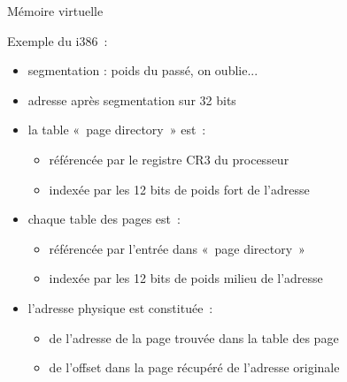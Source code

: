 \begin {frame} {Mémoire virtuelle}

    Exemple du i386~:

    \begin {itemize}
	\item segmentation : poids du passé, on oublie...
	\item adresse après segmentation sur 32 bits
	\item la table «~page directory~» est~:
	    \begin {itemize}
		\item référencée par le registre CR3 du processeur
		\item indexée par les 12 bits de poids fort de l'adresse
	    \end {itemize}
	\item chaque table des pages est~:
	    \begin {itemize}
		\item référencée par l'entrée dans «~page directory~»
		\item indexée par les 12 bits de poids milieu de l'adresse
	    \end {itemize}
	\item l'adresse physique est constituée~:
	    \begin {itemize}
		\item de l'adresse de la page trouvée dans la table des page
		\item de l'offset dans la page récupéré de l'adresse originale
	    \end {itemize}

    \end {itemize}

\end {frame}

